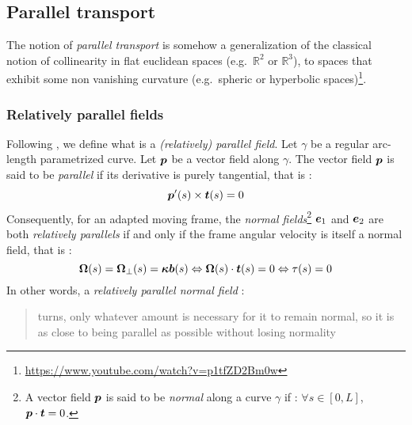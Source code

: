 \subsection{Parallel transport}\label{sec:paralleltransport}
The notion of \emph{parallel transport} is somehow a generalization of the classical notion of collinearity in flat euclidean spaces (e.g.\ $\mathbb{R}^2$ or $\mathbb{R}^3$), to spaces that exhibit some non vanishing curvature (e.g.\ spheric or hyperbolic spaces)\footnote{\url{https://www.youtube.com/watch?v=p1tfZD2Bm0w}}.

\subsubsection{Relatively parallel fields}
Following \cite{Bishop1975}, we define what is a \emph{(relatively) parallel field}. Let $\gamma$ be a regular arc-length parametrized curve. Let $\boldsymbol{p}$ be a vector field along $\gamma$. The vector field $\boldsymbol{p}$ is said to be \emph{parallel} if its derivative is purely tangential, that is :
\begin{equation}
	\boldsymbol{p}'(s) \times \boldsymbol{t}(s) = 0
\end{equation}
Consequently, for an adapted moving frame, the \emph{normal fields}\footnote{
A vector field $\boldsymbol{p}$ is said to be \emph{normal} along a curve $\gamma$ if : $\forall s \in [0,L]$, $\boldsymbol{p}\cdot\boldsymbol{t} = 0$.
} $\boldsymbol{e}_1$ and $\boldsymbol{e}_2$ are both \emph{relatively parallels} if and only if the frame angular velocity is itself a normal field, that is :
\begin{equation}
	\boldsymbol{\Omega}(s) = \boldsymbol{\Omega}_{\perp}(s) =  \boldsymbol{\kappa b}(s) \Leftrightarrow \boldsymbol{\Omega}(s) \cdot \boldsymbol{t}(s) = 0  \Leftrightarrow \tau(s) = 0  
\end{equation}
In other words, a \emph{relatively parallel normal field} : \blockcquote{Bishop1975}{turns, only whatever amount is necessary for it to remain normal, so it is as close to being parallel as possible without losing normality}. 
%

